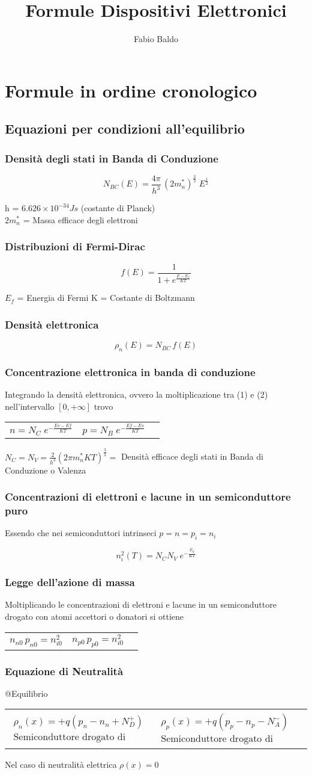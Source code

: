 \documentclass[12pt,a4paper]{article}
\author{Fabio Baldo}
\title{Formule Dispositivi Elettronici}
\makeatletter
\newcommand{\eqlist}[4]{ 
	\subsubsection*{#1}
	\parbox{19cm}{#2}
	
	\begin{equation}
	#3
	\end{equation}
	\noindent\parbox{19cm}{#4}}
\newcommand{\deqlist}[5]{
	\subsubsection*{#1}
	
	\parbox{19cm}{#2}
	
	\noindent\begin{tabularx}{\textwidth}{@{}XXX@{}}
	\begin{equation}
	#3
	\end{equation}  & 
	\begin{equation}
	#4
	\end{equation}
	
	\end{tabularx}
	
	\noindent\parbox{19cm}{#5}}
\makeatother
\begin{document}
	\section{Formule in ordine cronologico}	
	\subsection{Equazioni per condizioni all'equilibrio}
	
		\eqlist{Densità degli stati in Banda di Conduzione}
		{}
		{N_{BC}(E)=\frac{4\pi}{h^{3}} \, (2m^{*}_{n})^{\frac{3}{2}} \; E^{\frac{1}{2}}}
		{h = $ 6.626 \times 10^{-34} Js $ (costante di Planck) \\ $2m^{*}_{n}$ = Massa efficace degli elettroni}
		

		\eqlist{Distribuzioni di Fermi-Dirac}
		{}
		{f(E)= \frac{1}{1 + e^{{\frac{E-E_{f}}{KT}}}}}
		{$E_{f}$ = Energia di Fermi
		K = Costante di Boltzmann}
			

		\eqlist{Densità elettronica}
		{}
		{\rho_{n}(E) = N_{BC} \, f(E)}
		{}
		
		
		\deqlist {Concentrazione elettronica in banda di conduzione}
		{Integrando la densità elettronica, ovvero la moltiplicazione tra (1) e (2)  nell'intervallo $[0,+\infty]$ trovo}
		{ n = N_{C} \; e^{-\frac{Ec-Ef}{KT}}}
		{ p = N_{B} \;e^{-\frac{Ef-Ev}{KT}}}
		{$ N_{C}=N_{V} = \frac{2}{h^{3}}(2 \pi m_{n}^{*}KT)^{\frac{3}{2}} =$ Densità efficace degli stati in Banda di Conduzione o Valenza}
		
		
		\eqlist{Concentrazioni di elettroni e lacune in un semiconduttore puro}
		{Essendo che nei semiconduttori intrinseci $ p=n=p_{i}=n_{i} $}
		{n_{i}^{2}(T) = N_{C}N_{V} \; e^{-\frac{E_{g}}{KT}}}
		{}
		
		
		\deqlist{Legge dell'azione di massa}
		{Moltiplicando le concentrazioni di elettroni e lacune in un semiconduttore drogato con atomi accettori o donatori si ottiene}
		{n_{n0} \, p_{n0}=n_{i0}^{2}}
		{n_{p0} \, p_{p0}=n_{i0}^{2}}
		{}		
		
		
		\deqlist{Equazione di Neutralità}
		{@Equilibrio}
		{\begin{split}
				\rho_{n}(x) = +q(p_{n}-n_{n} + N_{D}^{+}) \\ \text{Semiconduttore drogato di tipo n}
		\end{split}}
		{\begin{split}
				\rho_{p}(x) = +q(p_{p}-n_{p} - N_{A}^{-}) \\ \text{Semiconduttore drogato di tipo p}
			\end{split}}
 		{Nel caso di neutralità elettrica $ \rho (x) = 0 $}
		
\end{document}
